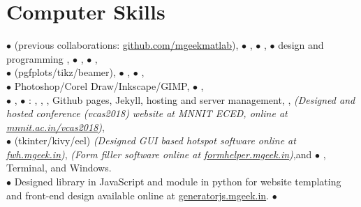 \vspace{-2.5em}
\section{Computer Skills}
{\scriptsize$\bullet$}  (previous collaborations: \href{https://github.com/mgeekmatlab}{github.com/mgeekmatlab}), {\scriptsize$\bullet$} , {\scriptsize$\bullet$} , {\scriptsize$\bullet$}  design and programming , {\scriptsize$\bullet$} , {\scriptsize$\bullet$} ,\\ 
{\scriptsize$\bullet$}  (pgfplots/tikz/beamer), {\scriptsize$\bullet$} , {\scriptsize$\bullet$} ,\\
{\scriptsize$\bullet$} Photoshop/Corel Draw/Inkscape/GIMP, {\scriptsize$\bullet$} , \\
{\scriptsize$\bullet$} , {\scriptsize$\bullet$} : , , , Github pages, Jekyll, hosting and server management, ,  \emph{(Designed and hosted conference (vcas2018) website at MNNIT ECED, online at \href{http://mnnit.ac.in/vcas2018}{mnnit.ac.in/vcas2018})}, \\
{\scriptsize$\bullet$}  (tkinter/kivy/eel) \emph{(Designed GUI based hotspot software online at \href{https://fwh.mgeek.in}{fwh.mgeek.in})}, \emph{(Form filler software online at \href{https://formhelper.mgeek.in}{formhelper.mgeek.in})},and {\scriptsize$\bullet$} , Terminal, and Windows.\\ {\scriptsize$\bullet$} Designed  library in JavaScript and  module in python for website templating and front-end design available online at \href{https://generatorjs.mgeek.in}{generatorjs.mgeek.in}. {\scriptsize$\bullet$} \\
\vspace{-1em}
\sectionline